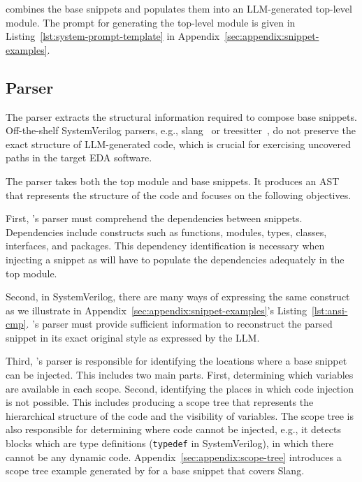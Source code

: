 \ourname combines the base snippets and populates them into an LLM-generated top-level module.
The prompt for generating the top-level module is given in Listing~\ref{lst:system-prompt-template} in Appendix~\ref{sec:appendix:snippet-examples}.

\subsection{Parser}
\label{sec:complex-code:parser}

The parser extracts the structural information required to compose base snippets.
Off-the-shelf SystemVerilog parsers, e.g., slang~\cite{popoloski2019slang} or treesitter~\cite{TreeSitter2025}, do not preserve the exact structure of LLM-generated code, which is crucial for exercising uncovered paths in the target EDA software.

The parser takes both the top module and base snippets.
It produces an AST that represents the structure of the code and focuses on the following objectives.

First, \ourname's parser must comprehend the dependencies between snippets.
Dependencies include constructs such as functions, modules, types, classes, interfaces, and packages.
This dependency identification is necessary when injecting a snippet as \ourname will have to populate the dependencies adequately in the top module.

Second, in SystemVerilog, there are many ways of expressing the same construct as we illustrate in Appendix~\ref{sec:appendix:snippet-examples}'s Listing~\ref{lst:ansi-cmp}.
\ourname’s parser must provide sufficient information to reconstruct the parsed snippet in its exact original style as expressed by the LLM.

Third, \ourname's parser is responsible for identifying the locations where a base snippet can be injected.
This includes two main parts.
First, determining which variables are available in each scope.
Second, identifying the places in which code injection is not possible.
This includes producing a scope tree that represents the hierarchical structure of the code and the visibility of variables.
The scope tree is also responsible for determining where code cannot be injected, e.g., it detects blocks which are type definitions (\texttt{typedef} in SystemVerilog), in which there cannot be any dynamic code.
Appendix~\ref{sec:appendix:scope-tree} introduces a scope tree example generated by \ourname for a base snippet that covers Slang.

